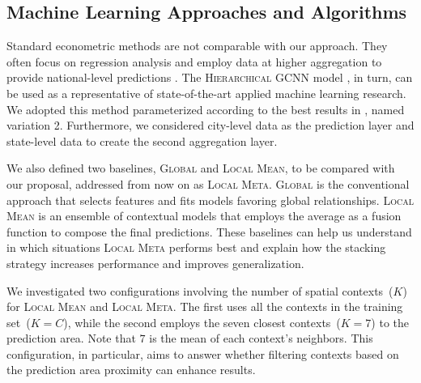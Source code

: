\documentclass[runningheads]{llncs}
\begin{document}

\subsection{Machine Learning Approaches and Algorithms}
\label{subsec:approaches}

Standard econometric methods are not comparable with our approach. They often focus on regression analysis and employ data at higher aggregation to provide national-level predictions \cite{graefe2019accuracy}. The \textsc{Hierarchical GCNN} model \cite{li2019deep}, in turn, can be used as a representative of state-of-the-art applied machine learning research. We adopted this method parameterized according to the best results in \cite{li2019deep}, named variation 2. Furthermore, we considered city-level data as the prediction layer and state-level data to create the second aggregation layer. %

We also defined two baselines, \textsc{Global} and \textsc{Local Mean}, to be compared with our proposal, addressed from now on as \textsc{Local Meta}. \textsc{Global} is the conventional approach that selects features and fits models favoring global relationships. \textsc{Local Mean} is an ensemble of contextual models that employs the average as a fusion function to compose the final predictions. These baselines can help us understand in which situations \textsc{Local Meta} performs best and explain how the stacking strategy increases performance and improves generalization.


We investigated two configurations involving the number of spatial contexts~($K$) for \textsc{Local Mean} and \textsc{Local Meta}. The first uses all the contexts in the training set~($K=C$), while the second employs the seven closest contexts~($K=7$) to the prediction area. Note that $7$ is the mean of each context's neighbors. This configuration, in particular, aims to answer whether filtering contexts based on the prediction area proximity can enhance results.
\end{document}
